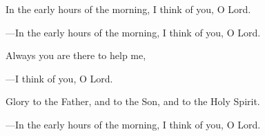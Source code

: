 \responsory
\begin{hangpar}

In the early hours of the morning, I think of you, O Lord.

{\color{red}---\thinspace}In the early hours of the morning, I think of you, O Lord.

\medskip Always you are there to help me,

{\color{red}---\thinspace}I think of you, O Lord.

\medskip Glory to the Father, and to the Son, and to the Holy Spirit.

{\color{red}---\thinspace}In the early hours of the morning, I think of you, O Lord.
\end{hangpar}
